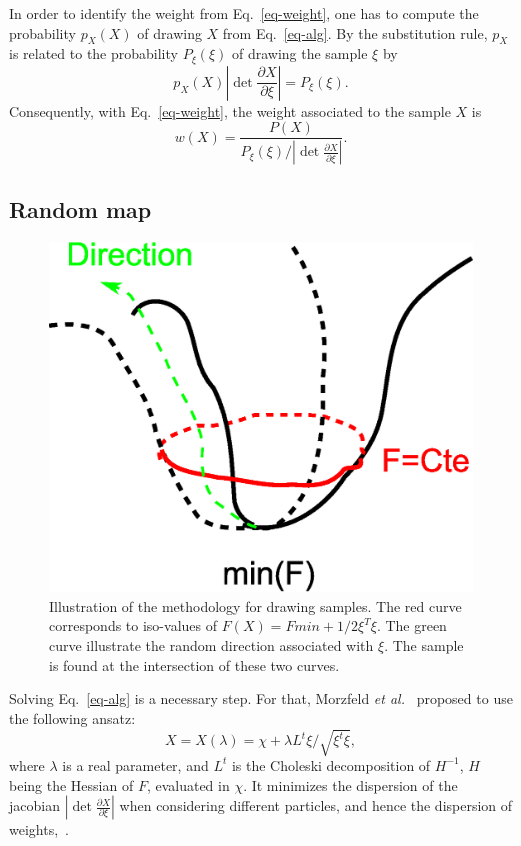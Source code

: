 \documentclass[10pt,openany,onecolumn,a4wide,pof]{article}
\newcommand{\mypar}[1]{\left(#1\right)}
\newcommand{\rpoint}{X}
\begin{document}
In order to identify the weight from Eq.~\eqref{eq-weight}, one has to compute the probability $p_{\rpoint}\mypar{\rpoint}$ of drawing $X$ from Eq.~\eqref{eq-alg}.
By the substitution rule, $p_X$ is related to the probability $P_{\xi}\mypar{\xi}$ of drawing the sample $\xi$ by
$$
p_{\rpoint}\mypar{\rpoint} \left|\det \frac{\partial \rpoint}{\partial \xi}\right|  = P_{\xi}\mypar{\xi}.
$$
Consequently, with Eq.~\eqref{eq-weight}, the weight associated to the sample $\rpoint$ is
\begin{equation}
w\mypar{\rpoint} = \frac{P\mypar{\rpoint}}{P_{\xi}\mypar{\xi}/\left|\det \frac{\partial \rpoint}{\partial \xi}\right|}.
\label{eq-weight_dev}
\end{equation}




\subsection{Random map}
\begin{figure}[t]
\center
\includegraphics[height=.25\linewidth]{./min.eps}
\caption{\small Illustration of the methodology for drawing samples. The red curve corresponds to iso-values of $F\mypar{\rpoint} = Fmin+1/2 \xi^T\xi$. The green curve illustrate the random direction associated with $\xi$. The sample is found at the intersection of these two curves.}
\label{fig-rmap}
\end{figure}

Solving Eq.~\eqref{eq-alg} is a necessary step. For that, Morzfeld \emph{et al.}~\cite{Morzfeld2012} proposed to use the following ansatz:
\begin{equation}
\rpoint = \rpoint\mypar{\lambda} = \chi + \lambda L^t \xi/\sqrt{\xi^t \xi},
\label{eq-ansatz}
\end{equation}
where $\lambda$ is a real parameter, and $L^t$ is the Choleski decomposition of $H^{-1}$, $H$ being the Hessian of $F$, evaluated in $\chi$.
It minimizes the dispersion of the jacobian $\left|\det \frac{\partial \rpoint}{\partial \xi}\right|$ when considering different particles, and hence the dispersion of weights,~\cite{Morzfeld2012}.
\end{document}
